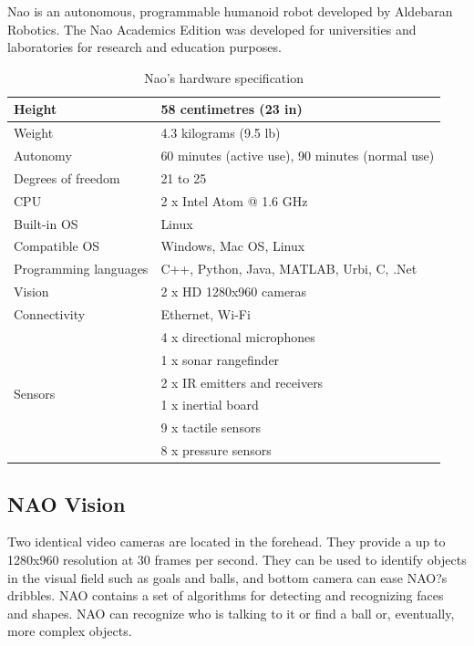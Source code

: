 Nao is an autonomous, programmable humanoid robot developed by Aldebaran Robotics. The Nao Academics Edition was developed for universities and laboratories for research and education purposes.
\begin{table}
	[h] \centering \caption{Nao's hardware specification } \label{tb:interf:1} 
	\begin{tabular}
		{|l|l|} \hline Height & 58 centimetres (23 in) \\
		\hline Weight & 4.3 kilograms (9.5 lb) \\
		\hline Autonomy & 60 minutes (active use), 90 minutes (normal use) \\
		\hline Degrees of freedom & 21 to 25 \\
		\hline CPU & 2 x Intel Atom @ 1.6 GHz \\
		\hline Built-in OS & Linux \\
		\hline Compatible OS & Windows, Mac OS, Linux \\
		\hline Programming languages & C++, Python, Java, MATLAB, Urbi, C, .Net \\
		\hline Vision & 2 x HD 1280x960 cameras \\
		\hline Connectivity & Ethernet, Wi-Fi \\
		\hline \multirow{6}{*}{Sensors} & 4 x directional microphones \\
		& 1 x sonar rangefinder \\
		& 2 x IR emitters and receivers \\
		& 1 x inertial board \\
		& 9 x tactile sensors \\
		& 8 x pressure sensors \\
		\hline 
	\end{tabular}
\end{table}

\subsection{NAO Vision} Two identical video cameras are located in the forehead. They provide a up to 1280x960 resolution at 30 frames per second. They can be used to identify objects in the visual field such as goals and balls, and bottom camera can ease NAO?s dribbles. NAO contains a set of algorithms for detecting and recognizing faces and shapes. NAO can recognize who is talking to it or find a ball or, eventually, more complex objects.

